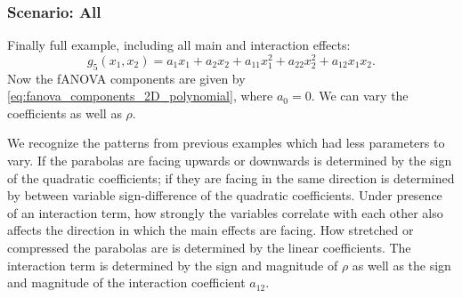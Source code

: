 \subsubsection*{Scenario: All}
Finally full example, including all main and interaction effects:
$$g_5(x_1, x_2) = a_1 x_1 + a_2 x_2 + a_{11} x_1^2 + a_{22} x_2^2 + a_{12} x_1 x_2.$$
Now the fANOVA components are given by \autoref{eq:fanova_components_2D_polynomial}, where $a_0 = 0$.
We can vary the coefficients as well as $\rho$.\par
We recognize the patterns from previous examples which had less parameters to vary. If the parabolas are facing upwards or downwards is determined by the sign of the quadratic coefficients; if they are facing in the same direction is determined by between variable sign-difference of the quadratic coefficients. Under presence of an interaction term, how strongly the variables correlate with each other also affects the direction in which the main effects are facing. How stretched or compressed the parabolas are is determined by the linear coefficients. The interaction term is determined by the sign and magnitude of $\rho$ as well as the sign and magnitude of the interaction coefficient $a_{12}$.\par

